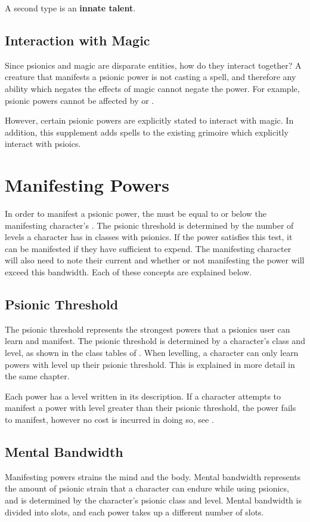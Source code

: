 A second type is an \textbf{innate talent}.

\subsection{Interaction with Magic}
Since psionics and magic are disparate entities,
how do they interact together?
A creature that manifests a psionic power is not
casting a spell,
and therefore any ability which negates the effects
of magic cannot negate the power.
For example, psionic powers cannot be affected by
 or .

However, certain psionic powers are explicitly stated
to interact with magic.
In addition, this supplement adds spells to the existing
grimoire which explicitly interact with psioics.

\section{Manifesting Powers}
In order to manifest a psionic power,
the  must be equal to or below
the manifesting character's .
The psionic threshold is determined by the number of levels
a character has in classes with psionics.
If the power satisfies this test,
it can be manifested if they have sufficient 
to expend.
The manifesting character will also need to note their
current  and whether or not manifesting
the power will exceed this bandwidth.
Each of these concepts are explained below.

\subsection{Psionic Threshold}
The psionic threshold represents the strongest powers
that a psionics user can learn and manifest.
The psionic threshold is determined by a character's class
and level,
as shown in the class tables of .
When levelling,
a character can only learn powers with level up
their psionic threshold.
This is explained in more detail in the same chapter.

Each power has a level written in its description.
If a character attempts to manifest a power with level
greater than their psionic threshold,
the power fails to manifest,
however no cost is incurred in doing so,
see .

\subsection{Mental Bandwidth}
Manifesting powers strains the mind and the body.
Mental bandwidth represents the amount of psionic strain that
a character can endure while using psionics,
and is determined by the character's psionic class and level.
Mental bandwidth is divided into slots,
and each power takes up a different number of slots.

